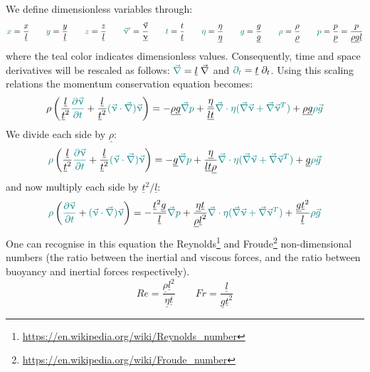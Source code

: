 \documentclass[a4paper,11pt]{article}
\begin{document}
We define dimensionless variables through:
\[
{\color{teal}x} = \frac{x}{\underline{l}}
\qquad
{\color{teal}y} = \frac{y}{\underline{l}}
\qquad
{\color{teal}z} = \frac{z}{\underline{l}}
\qquad
{\color{teal}\vec\upnu'} = \frac{\vec\upnu}{\underline{\upnu}}
\qquad
{\color{teal}t} = \frac{t}{\underline{t}}
\qquad
{\color{teal} \eta} = \frac{\eta}{\underline{\eta}}
\qquad
{\color{teal} g} =\frac{g}{\underline{g}}
\qquad
{\color{teal} \rho} =\frac{\rho}{\underline{\rho}}
\qquad
{\color{teal} p} = \frac{p}{\underline{p}}=\frac{p}{\underline{\rho}\underline{g} \underline{l}}
\]
where the {\color{teal}teal} color indicates dimensionless values.
Consequently, time and space derivatives will be rescaled as follows:
${\color{teal} \vec\nabla} = \underline{l}\; \vec\nabla$ and ${\color{teal} \partial_t} = \underline{t}\; \partial_t$.
Using this scaling relations the momentum conservation equation becomes:
\[
\rho \left( 
\frac{ \underline{l}}{\underline{t}^2} {\color{teal} \frac{\partial \vec\upnu}{\partial t}}
+ \frac{ \underline{l}}{\underline{t}^2} {\color{teal} (\vec\upnu \cdot\vec\nabla) \vec\upnu}  \right)
=- \underline{\rho} \underline{g} {\color{teal} \vec\nabla p}
+ \frac{\underline{\eta}}{\underline{l}\underline{t}} 
{\color{teal} \vec\nabla \cdot \eta (\vec\nabla \vec \upnu + \vec\nabla \vec \upnu ^T)}
+ \underline{\rho} \underline{g}  {\color{teal} \rho \vec{g}}
\]
We divide each side by $\underline{\rho} $:
\[
{\color{teal} \rho} \left( 
\frac{ \underline{l}}{\underline{t}^2} {\color{teal} \frac{\partial \vec\upnu}{\partial t}}
+ \frac{ \underline{l}}{\underline{t}^2} {\color{teal} (\vec\upnu \cdot\vec\nabla) \vec\upnu}  \right)
=-  \underline{g} {\color{teal} \vec\nabla p}
+ \frac{\underline{\eta}}{\underline{l}\underline{t} \underline{\rho}} 
{\color{teal} \vec\nabla \cdot \eta (\vec\nabla \vec \upnu + \vec\nabla \vec \upnu ^T)}
+ \underline{g}   {\color{teal} \rho \vec{g}}
\]
and now multiply each side by $\underline{t}^2 /\underline{l}$:
\[
{\color{teal} \rho} \left( 
{\color{teal} \frac{\partial \vec\upnu}{\partial t}}
+  {\color{teal} (\vec\upnu \cdot\vec\nabla) \vec\upnu}  \right)
=- \frac{\underline{t}^2 \underline{g}   }{\underline{l}} {\color{teal} \vec\nabla p}
+ \frac{\underline{\eta}\underline{t} }{\underline{\rho} \underline{l}^2 } 
{\color{teal} \vec\nabla \cdot \eta (\vec\nabla \vec \upnu + \vec\nabla \vec \upnu ^T)}
+ \frac {\underline{g} \underline{t}^2 }{ \underline{l} }  {\color{teal} \rho \vec{g}}
\]
One can recognise in this equation the Reynolds\footnote{\url{https://en.wikipedia.org/wiki/Reynolds_number}} 
and Froude\footnote{\url{https://en.wikipedia.org/wiki/Froude_number}} 
non-dimensional numbers (the ratio between the inertial and viscous forces, and the 
ratio between buoyancy and inertial forces respectively). 
\[
Re = \frac{\underline{\rho} \underline{l}^2}{\underline{\eta} \underline{t} }
\qquad
Fr= \frac{\underline{l}}{\underline{g}\underline{t}^2 }
\]
\end{document}
